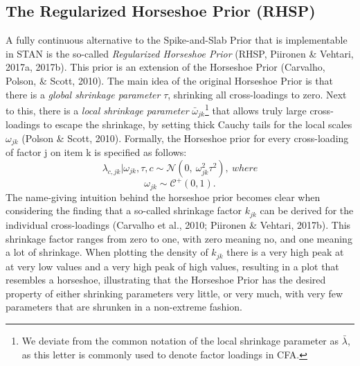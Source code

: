 \documentclass[
  man, donotrepeattitle,floatsintext]{apa6}
\begin{document}
\hypertarget{the-regularized-horseshoe-prior-rhsp}{%
\subsection{The Regularized Horseshoe Prior (RHSP)}\label{the-regularized-horseshoe-prior-rhsp}}

A fully continuous alternative to the Spike-and-Slab Prior that is implementable in STAN is the so-called \emph{Regularized Horseshoe Prior} (RHSP, Piironen \& Vehtari, 2017a, 2017b). This prior is an extension of the Horseshoe Prior (Carvalho, Polson, \& Scott, 2010). The main idea of the original Horseshoe Prior is that there is a \emph{global shrinkage parameter} \(\tau\), shrinking all cross-loadings to zero. Next to this, there is a \emph{local shrinkage parameter} \(\bar{\omega}_{jk}\)\footnote{We deviate from the common notation of the local shrinkage parameter as \(\bar{\lambda}\), as this letter is commonly used to denote factor loadings in CFA.} that allows truly large cross-loadings to escape the shrinkage, by setting thick Cauchy tails for the local scales \(\omega_{jk}\) (Polson \& Scott, 2010). Formally, the Horseshoe prior for every cross-loading of factor j on item k is specified as follows:
\[\lambda_{c,jk} | \omega_{jk}, \tau, c\sim \mathcal{N}(0, \ \omega^2_{jk} \tau^2), \ where\]
\[\omega_{jk} \sim \mathcal{C^+}(0, 1).\]
The name-giving intuition behind the horseshoe prior becomes clear when considering the finding that a so-called shrinkage factor \(k_{jk}\) can be derived for the individual cross-loadings (Carvalho et al., 2010; Piironen \& Vehtari, 2017b). This shrinkage factor ranges from zero to one, with zero meaning no, and one meaning a lot of shrinkage. When plotting the density of \(k_{jk}\) there is a very high peak at at very low values and a very high peak of high values, resulting in a plot that resembles a horseshoe, illustrating that the Horseshoe Prior has the desired property of either shrinking parameters very little, or very much, with very few parameters that are shrunken in a non-extreme fashion.
\end{document}
